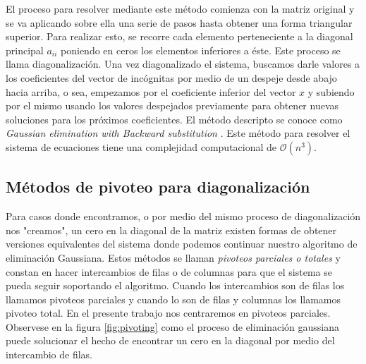 El proceso para resolver mediante este método comienza con la matriz original y se va aplicando sobre ella una serie de pasos hasta obtener una forma triangular superior. Para realizar esto, se recorre cada elemento perteneciente a la diagonal principal $a_{ii}$ poniendo en ceros los elementos inferiores a éste. Este proceso se llama diagonalización. Una vez diagonalizado el sistema, buscamos darle valores a los coeficientes del vector de incógnitas por medio de un despeje desde abajo hacia arriba, o sea, empezamos por el coeficiente inferior del vector $x$ y subiendo por el mismo usando los valores despejados previamente para obtener nuevas soluciones para los próximos coeficientes. El método descripto se conoce como \textit{Gaussian elimination with Backward substitution} \cite{Burden11}. Este método para resolver el sistema de ecuaciones tiene una complejidad computacional de $\mathcal{O}(n^3)$.

\subsection{Métodos de pivoteo para diagonalización}

Para casos donde encontramos, o por medio del mismo proceso de diagonalización nos "creamos", un cero en la diagonal de la matriz existen formas de obtener versiones equivalentes del sistema donde podemos continuar nuestro algoritmo de eliminación Gaussiana. Estos métodos se llaman \textit{pivoteos parciales o totales} y constan en hacer intercambios de filas o de columnas para que el sistema se pueda seguir soportando el algoritmo. Cuando los intercambios son de filas los llamamos pivoteos parciales y cuando lo son de filas y columnas los llamamos pivoteo total. En el presente trabajo nos centraremos en pivoteos parciales. Observese en la figura \ref{fig:pivoting} como el proceso de eliminación gaussiana puede solucionar el hecho de encontrar un cero en la diagonal por medio del intercambio de filas.

